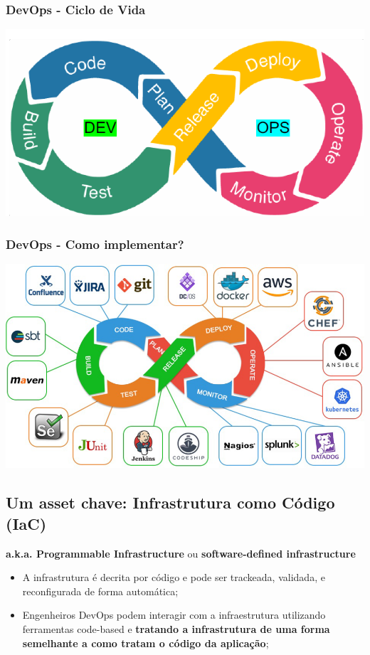 \documentclass{article}
\begin{document}
\subsubsection{DevOps - Ciclo de Vida}

\begin{center}
  \includegraphics[scale=0.55]{36}
\end{center}

\subsubsection{DevOps - Como implementar?}

\begin{center}
  \includegraphics[scale=0.55]{37}
\end{center}

\pagebreak

\subsection{Um asset chave: Infrastrutura como Código (IaC)}

\textbf{a.k.a. Programmable Infrastructure} ou \textbf{software-defined
infrastructure}
\begin{itemize}
  \item A infrastrutura é decrita por código e pode ser trackeada,
  validada, e reconfigurada de forma automática;
  \item Engenheiros DevOps podem interagir com a infraestrutura utilizando
  ferramentas code-based e \textbf{tratando a infrastrutura de uma
  forma semelhante a como tratam o código da aplicação};
\end{itemize}
\end{document}
